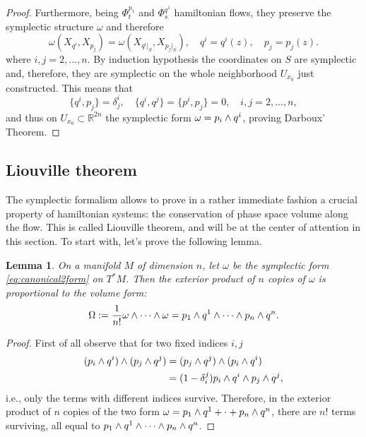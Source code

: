 \documentclass[english,fontsize=11pt,paper=a5,oneside]{scrbook}
\newcommand{\R}{\mathbb{R}}
\let\d\relax
\newcommand{\d}{\mathrm{d}}
\newtheorem{lemma}[theorem]{Lemma}
\theoremstyle{definition}
\begin{document}
\begin{proof}
  Furthermore, being $\Phi_t^{p_1}$ and $\Phi_s^{q^1}$ hamiltonian flows, they preserve the symplectic structure $\omega$ and therefore
  \begin{equation}
    \omega(X_{q^i}, X_{p_j}) = \omega(X_{q^i|_S}, X_{p_j|_S}),
    \quad q^i = q^i(z),
    \quad p_j = p_j(z).
  \end{equation}
  where $i,j=2,\ldots,n$.
  By induction hypothesis the coordinates on $S$ are symplectic and, therefore, they are symplectic on the whole neighborhood $U_{x_0}$ just constructed.
  This means that
  \begin{equation}
    \big\{q^i, p_j\big\} = \delta_j^i, \quad
    \big\{q^i, q^j\big\} = \big\{p^i, p_j\big\} = 0, \quad
    i,j=2,\ldots,n,
  \end{equation}
  and thus on $U_{x_0}\subset\R^{2n}$ the symplectic form $\omega=\d p_i \wedge \d q^i$, proving Darboux' Theorem.
\end{proof}

\subsection{Liouville theorem}

The symplectic formalism allows to prove in a rather immediate fashion a crucial property of hamiltonian systems: the conservation of phase space volume along the flow.
This is called Liouville theorem, and will be at the center of attention in this section.
To start with, let's prove the following lemma.

\begin{lemma}
  On a manifold $M$ of dimension $n$, let $\omega$ be the symplectic form \eqref{eq:canonical2form} on $T^* M$. Then the exterior product of $n$ copies of $\omega$ is proportional to the volume form:
  \begin{equation}
    \Omega := \frac1{n!} \omega \wedge \cdots \wedge \omega = \d p_1 \wedge \d q^1 \wedge \cdots \wedge \d p_n \wedge \d q^n.
  \end{equation}
\end{lemma}
\begin{proof}
  First of all observe that for two fixed indices $i,j$
  \begin{align}
    (\d p_i \wedge \d q^i)\wedge (\d p_j \wedge \d q^j) & =
    (\d p_j \wedge \d q^j)\wedge (\d p_i \wedge \d q^i)     \\
                                                        & =
    (1-\delta_i^j) \d p_i \wedge \d q^i \wedge \d p_j \wedge \d q^j,
  \end{align}
  i.e., only the terms with different indices survive.
  Therefore, in the exterior product of $n$ copies of the two form $\omega = \d p_1 \wedge \d q^1 + \cdot + \d p_n \wedge \d q^n$, there are $n!$ terms surviving, all equal to $\d p_1 \wedge \d q^1 \wedge \cdots \wedge \d p_n \wedge \d q^n$.
\end{proof}
\end{document}
